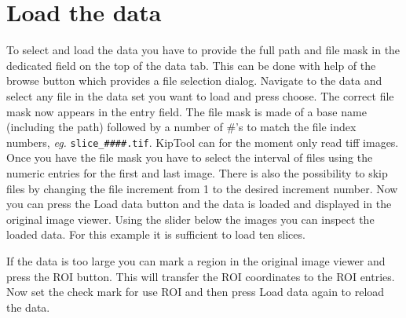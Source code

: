 \documentclass[a4paper]{scrreprt}
\begin{document}
\section{Load the data}
To select and load the data you have to provide the full path and file mask in the dedicated field on the top of the data tab. This can be done with help of the browse button which provides a file selection dialog. Navigate to the data and select any file in the data set you want to load and press choose. The correct file mask now appears in the entry field. The file mask is made of a base name (including the path) followed by a number of \#'s to match the file index numbers, \emph{eg.} \verb+slice_####.tif+. KipTool can for the moment only read tiff images. Once you have the file mask you have to select the interval of files using the numeric entries for the first and last image. There is also the possibility to skip files by changing the file increment from 1 to the desired increment number. Now you can press the Load data button and the data is loaded and displayed in the original image viewer. Using the slider below the images you can inspect the loaded data. For this example it is sufficient to load ten slices. 

If the data is too large you can mark a region in the original image viewer and press the ROI button. This will transfer the ROI coordinates to the ROI entries. Now set the check mark for use ROI and then press Load data again to reload the data.
 
\end{document}

